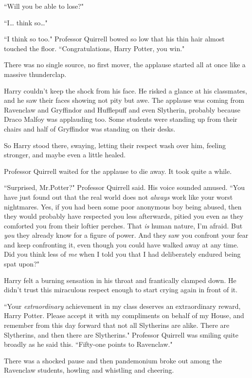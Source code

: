 ``Will you be able to lose?"

``I{\ldots} think so{\ldots}"

``I think so too." Professor Quirrell bowed so low that his thin hair almost touched the floor. ``Congratulations, Harry Potter, you win."

There was no single source, no first mover, the applause started all at once like a massive thunderclap.

Harry couldn't keep the shock from his face. He risked a glance at his classmates, and he saw their faces showing not pity but awe. The applause was coming from Ravenclaw and Gryffindor and Hufflepuff and even Slytherin, probably because Draco Malfoy was applauding too. Some students were standing up from their chairs and half of Gryffindor was standing on their desks.

So Harry stood there, swaying, letting their respect wash over him, feeling stronger, and maybe even a little healed.

Professor Quirrell waited for the applause to die away. It took quite a while.

``Surprised, Mr.\?Potter?" Professor Quirrell said. His voice sounded amused. ``You have just found out that the real world does not \emph{always} work like your worst nightmares. Yes, if you had been some poor anonymous boy being abused, then they would probably have respected you less afterwards, pitied you even as they comforted you from their loftier perches. That \emph{is} human nature, I'm afraid. But \emph{you} they already know for a figure of power. And they saw you confront your fear and keep confronting it, even though you could have walked away at any time. Did you think less of \emph{me} when I told you that I had deliberately endured being spat upon?"

Harry felt a burning sensation in his throat and frantically clamped down. He didn't trust this miraculous respect enough to start crying again in front of it.

``Your \emph{extraordinary} achievement in my class deserves an extraordinary reward, Harry Potter. Please accept it with my compliments on behalf of my House, and remember from this day forward that not all Slytherins are alike. There are Slytherins, and then there are Slytherins." Professor Quirrell was smiling quite broadly as he said this. ``Fifty-one points to Ravenclaw."

There was a shocked pause and then pandemonium broke out among the Ravenclaw students, howling and whistling and cheering.

